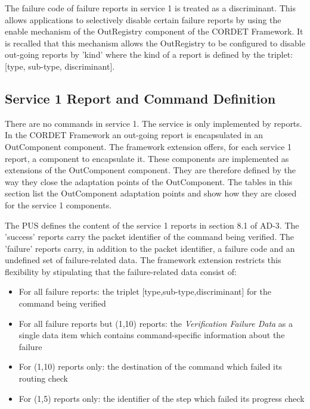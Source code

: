 \documentclass{pnp_article}
\begin{document}
The failure code of failure reports in service 1 is treated as a discriminant. This allows applications to selectively disable certain failure reports by using the enable mechanism of the OutRegistry component of the CORDET Framework. It is recalled that this mechanism allows the OutRegistry to be configured to disable out-going reports by 'kind' where the kind of a report is defined by the triplet: [type, sub-type, discriminant]. 


\subsection{Service 1 Report and Command Definition}\label{sec:serv1RepDef}
There are no commands in service 1. The service is only implemented by reports. In the CORDET Framework an out-going report is encapsulated in an OutComponent component. The framework extension offers, for each service 1 report, a component to encapsulate it. These components are implemented as extensions of the OutComponent component. They are therefore defined by the way they close the adaptation points of the OutComponent. The tables in this section list the OutComponent adaptation points and show how they are closed for the service 1 components.

The PUS defines the content of the service 1 reports in section 8.1 of AD-3. The 'success' reports carry the packet identifier of the command being verified. The 'failure' reports carry, in addition to the packet identifier, a failure code and an undefined set of failure-related data. The framework extension restricts this flexibility by stipulating that the failure-related data consist of: 

\begin{itemize}
\item For all failure reports: the triplet [type,sub-type,discriminant] for the command being verified
\item For all failure reports but (1,10) reports: the \textit{Verification Failure Data} as a single data item which contains command-specific information about the failure 
\item For (1,10) reports only: the destination of the command which failed its routing check
\item For (1,5) reports only: the identifier of the step which failed its progress check
\end{itemize}
\end{document}

